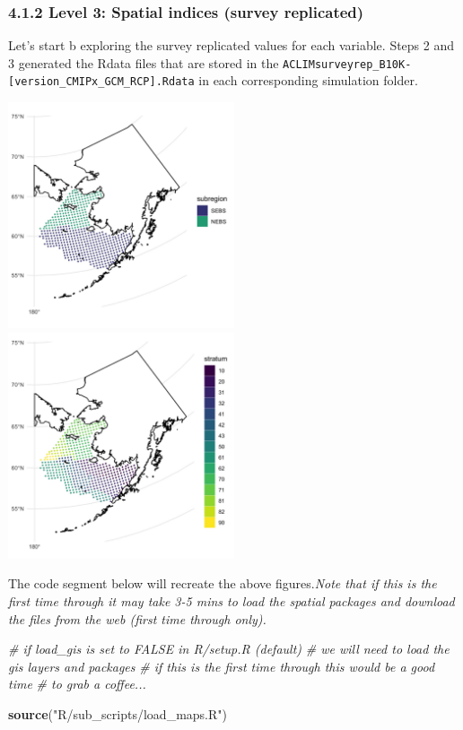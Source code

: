 \documentclass[
]{article}
\newenvironment{Shaded}{\begin{snugshade}}{\end{snugshade}}
\newcommand{\CommentTok}[1]{\textcolor[rgb]{0.56,0.35,0.01}{\textit{#1}}}
\newcommand{\KeywordTok}[1]{\textcolor[rgb]{0.13,0.29,0.53}{\textbf{#1}}}
\newcommand{\NormalTok}[1]{#1}
\newcommand{\StringTok}[1]{\textcolor[rgb]{0.31,0.60,0.02}{#1}}
\begin{document}
\hypertarget{level-3-spatial-indices-survey-replicated}{%
\subsubsection{4.1.2 Level 3: Spatial indices (survey
replicated)}\label{level-3-spatial-indices-survey-replicated}}

Let's start b exploring the survey replicated values for each variable.
Steps 2 and 3 generated the Rdata files that are stored in the
\texttt{ACLIMsurveyrep\_B10K-{[}version\_CMIPx\_GCM\_RCP{]}.Rdata} in
each corresponding simulation folder.

\includegraphics[width=0.5\textwidth,height=\textheight]{Figs/stations_NS.jpg}
\includegraphics[width=0.5\textwidth,height=\textheight]{Figs/stations.jpg}

The code segment below will recreate the above figures.\emph{Note that
if this is the first time through it may take 3-5 mins to load the
spatial packages and download the files from the web (first time through
only).}

\begin{Shaded}
\begin{Highlighting}[]
   \CommentTok{# if load_gis is set to FALSE in R/setup.R (default) }
   \CommentTok{# we will need to load the gis layers and packages}
   \CommentTok{# if this is the first time through this would be a good time}
   \CommentTok{# to grab a coffee...}

   \KeywordTok{source}\NormalTok{(}\StringTok{"R/sub_scripts/load_maps.R"}\NormalTok{)}
\end{Highlighting}
\end{Shaded}
\end{document}
